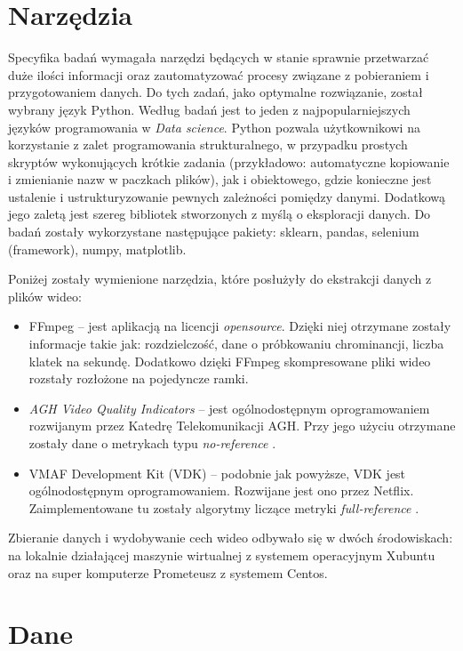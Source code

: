 \section{Narzędzia}
Specyfika badań wymagała narzędzi będących w stanie sprawnie przetwarzać duże ilości informacji oraz zautomatyzować procesy związane z pobieraniem i przygotowaniem danych. Do tych zadań, jako optymalne rozwiązanie, został wybrany język Python. Według badań \cite{python} jest to jeden z najpopularniejszych języków programowania w {\em Data science}. Python pozwala użytkownikowi na korzystanie z zalet programowania strukturalnego, w przypadku prostych skryptów wykonujących krótkie zadania (przykładowo: automatyczne kopiowanie i zmienianie nazw w paczkach plików), jak i obiektowego, gdzie konieczne jest ustalenie i ustrukturyzowanie pewnych zależności pomiędzy danymi. Dodatkową jego zaletą jest szereg bibliotek stworzonych z myślą o eksploracji danych. Do badań zostały wykorzystane następujące pakiety: sklearn, pandas, selenium (framework), numpy, matplotlib.\par\par
Poniżej zostały wymienione narzędzia, które posłużyły do ekstrakcji danych z plików wideo:
\begin{itemize}[label=$\bullet$]
\item FFmpeg -- jest aplikacją na licencji {\em opensource}. Dzięki niej otrzymane zostały informacje takie jak: rozdzielczość, dane o próbkowaniu chrominancji, liczba klatek na sekundę. Dodatkowo dzięki FFmpeg skompresowane pliki wideo rozstały rozłożone na pojedyncze ramki.
\item {\em AGH Video Quality Indicators} -- jest ogólnodostępnym oprogramowaniem rozwijanym przez Katedrę Telekomunikacji AGH. Przy jego użyciu otrzymane zostały dane o metrykach typu {\em no-reference} \cite{agh_vqm}.
\item VMAF Development Kit (VDK) -- podobnie jak powyższe, VDK jest ogólnodostępnym oprogramowaniem. Rozwijane jest ono przez Netflix. Zaimplementowane tu zostały algorytmy liczące metryki {\em full-reference} \cite{vdk}.
\end{itemize}
Zbieranie danych i wydobywanie cech wideo odbywało się w dwóch środowiskach: na lokalnie działającej maszynie wirtualnej z systemem operacyjnym Xubuntu oraz na super komputerze Prometeusz z systemem Centos. 

\label{cha:drugiDokument}



\section{Dane}
\label{cha:drugiDokument}

